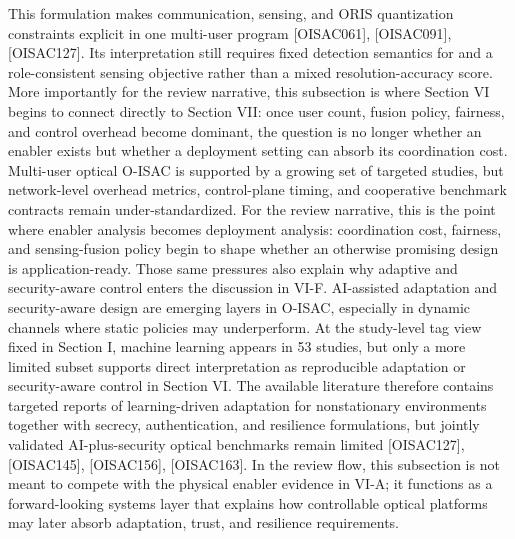 {}\markdownRendererParagraphSeparator
{}This formulation makes communication, sensing, and ORIS quantization constraints explicit in one multi-user program [O\markdownRendererUnderscore{}ISAC\markdownRendererUnderscore{}061], [O\markdownRendererUnderscore{}ISAC\markdownRendererUnderscore{}091], [O\markdownRendererUnderscore{}ISAC\markdownRendererUnderscore{}127]. Its interpretation still requires fixed detection semantics for  and a role-consistent sensing objective rather than a mixed resolution-accuracy score. More importantly for the review narrative, this subsection is where Section VI begins to connect directly to Section VII: once user count, fusion policy, fairness, and control overhead become dominant, the question is no longer whether an enabler exists but whether a deployment setting can absorb its coordination cost.\markdownRendererParagraphSeparator
{} Multi-user optical O-ISAC is supported by a growing set of targeted studies, but network-level overhead metrics, control-plane timing, and cooperative benchmark contracts remain under-standardized. For the review narrative, this is the point where enabler analysis becomes deployment analysis: coordination cost, fairness, and sensing-fusion policy begin to shape whether an otherwise promising design is application-ready. Those same pressures also explain why adaptive and security-aware control enters the discussion in VI-F.\markdownRendererInterblockSeparator
{}
\markdownRendererSectionEnd \markdownRendererSectionBegin
{}\markdownRendererInterblockSeparator
{}AI-assisted adaptation and security-aware design are emerging layers in O-ISAC, especially in dynamic channels where static policies may underperform. At the study-level tag view fixed in Section I, machine learning appears in 53 studies, but only a more limited subset supports direct interpretation as reproducible adaptation or security-aware control in Section VI. The available literature therefore contains targeted reports of learning-driven adaptation for nonstationary environments together with secrecy, authentication, and resilience formulations, but jointly validated AI-plus-security optical benchmarks remain limited [O\markdownRendererUnderscore{}ISAC\markdownRendererUnderscore{}127], [O\markdownRendererUnderscore{}ISAC\markdownRendererUnderscore{}145], [O\markdownRendererUnderscore{}ISAC\markdownRendererUnderscore{}156], [O\markdownRendererUnderscore{}ISAC\markdownRendererUnderscore{}163]. In the review flow, this subsection is not meant to compete with the physical enabler evidence in VI-A; it functions as a forward-looking systems layer that explains how controllable optical platforms may later absorb adaptation, trust, and resilience requirements.\markdownRendererParagraphSeparator
